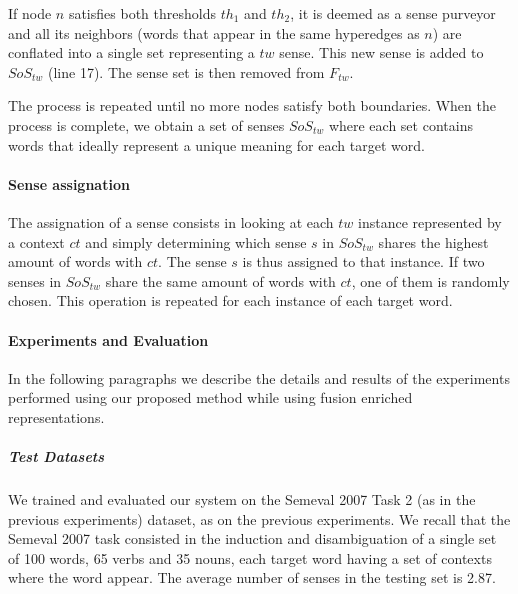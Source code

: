 If node $n$ satisfies both thresholds $th_1$ and $th_2$, it is deemed as a sense purveyor and all its neighbors (words that appear in the same hyperedges as $n$) are conflated into a single set representing a $tw$ sense. This new sense is added to $SoS_{tw}$ (line 17). The sense set is then removed from $F_{tw}$.

The process is repeated until no more nodes satisfy both boundaries. When the process is complete, we obtain a set of senses $SoS_{tw}$ where each set contains words that ideally represent a unique meaning for each target word. 

\paragraph{Sense assignation}

The assignation of a sense consists in looking at each $tw$ instance represented by a context $ct$ and simply determining which sense $s$ in $SoS_{tw}$ shares the highest amount of words with $ct$. The sense $s$ is thus assigned to that instance. If two senses in $SoS_{tw}$ share the same amount of words with $ct$, one of them is randomly chosen.  This operation is repeated for each instance of each target word. 



	
\paragraph{Experiments and Evaluation}
In the following paragraphs we describe the details and results of the experiments performed using our proposed method while using fusion enriched representations.
\subparagraph{Test Datasets}
We trained and evaluated our system on the Semeval 2007 Task 2 (as in the previous experiments) dataset, as on the previous experiments. We recall that the Semeval 2007 task consisted in the induction and disambiguation of a single set of 100 words, 65 verbs and 35 nouns, each target word having a set of contexts where the word appear. The average number of senses in the testing set is 2.87. 


